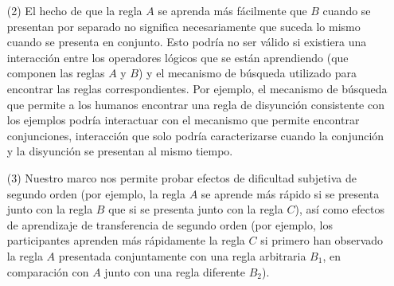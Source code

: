 \begin{enumerate}
\item [(2)] 
El hecho de que la regla $A$ se aprenda más fácilmente que $B$ cuando se presentan por separado no significa necesariamente que suceda lo mismo cuando se presenta en conjunto. Esto podría no ser válido si existiera una interacción entre los operadores lógicos que se están aprendiendo (que componen las reglas $A$ y $B$) y el mecanismo de búsqueda utilizado para encontrar las reglas correspondientes. Por ejemplo, el mecanismo de búsqueda que permite a los humanos encontrar una regla de disyunción consistente con los ejemplos podría interactuar con el mecanismo que permite encontrar conjunciones, interacción que solo podría caracterizarse cuando la conjunción y la disyunción se presentan al mismo tiempo.

\item [(3)] 
Nuestro marco nos permite probar efectos de dificultad subjetiva de segundo orden (por ejemplo, la regla $A$ se aprende más rápido si se presenta junto con la regla $B$ que si se presenta junto con la regla $C$), así como efectos de aprendizaje de transferencia de segundo orden (por ejemplo, los participantes aprenden más rápidamente la regla $C$ si primero han observado la regla $A$ presentada conjuntamente con una regla arbitraria $B_1$, en comparación con $A$ junto con una regla diferente $B_2$).


\end{enumerate}
